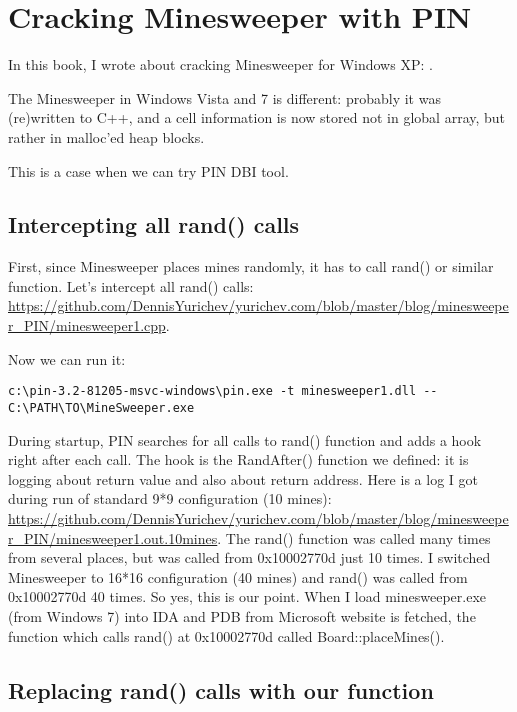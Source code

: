 \section{Cracking Minesweeper with PIN}

In this book, I wrote about cracking Minesweeper for Windows XP: .

The Minesweeper in Windows Vista and 7 is different: probably it was (re)written to C++, and a cell information
is now stored not in global array, but rather in malloc'ed heap blocks.

This is a case when we can try PIN DBI tool.

\subsection{Intercepting all rand() calls}

First, since Minesweeper places mines randomly, it has to call rand() or similar function.
Let's intercept all rand() calls: \url{https://github.com/DennisYurichev/yurichev.com/blob/master/blog/minesweeper_PIN/minesweeper1.cpp}.

Now we can run it:

\begin{lstlisting}
c:\pin-3.2-81205-msvc-windows\pin.exe -t minesweeper1.dll -- C:\PATH\TO\MineSweeper.exe
\end{lstlisting}

During startup, PIN searches for all calls to rand() function and adds a hook right after each call.
The hook is the RandAfter() function we defined: it is logging about return value and also about return address.
Here is a log I got during run of standard 9*9 configuration (10 mines): \url{https://github.com/DennisYurichev/yurichev.com/blob/master/blog/minesweeper_PIN/minesweeper1.out.10mines}.
The rand() function was called many times from several places, but was called from 0x10002770d just 10 times.
I switched Minesweeper to 16*16 configuration (40 mines) and rand() was called from 0x10002770d 40 times.
So yes, this is our point.
When I load minesweeper.exe (from Windows 7) into IDA and PDB from Microsoft website is fetched,
the function which calls rand() at 0x10002770d called Board::placeMines().

\subsection{Replacing rand() calls with our function}

